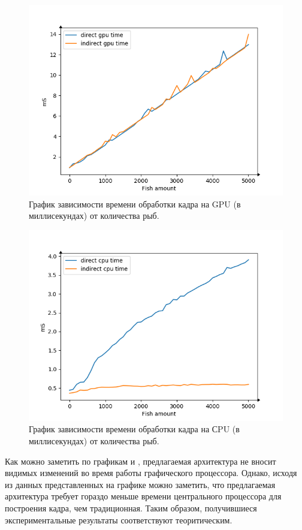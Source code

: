 	\begin{figure}[ht!] 
		\center
		\includegraphics [scale=0.8] {my_folder/images//gpu_plot}	
		\caption{График зависимости времени обработки кадра на GPU (в миллисекундах) от количества рыб.} 
		\label{fig:gpu_plot}
	\end{figure}

	\begin{figure}[ht!] 
		\center
		\includegraphics [scale=0.8] {my_folder/images//cpu_plot}	
		\caption{График зависимости времени обработки кадра на СPU (в миллисекундах) от количества рыб.} 
		\label{fig:cpu_plot}
	\end{figure}
	\FloatBarrier
	
	Как можно заметить по графикам  и , предлагаемая архитектура не вносит видимых изменений во время работы графического процессора. Однако, исходя из данных представленных на графике  можно заметить, что предлагаемая архитектура требует гораздо меньше времени центрального процессора для построения кадра, чем традиционная. Таким образом, получившиеся экспериментальные результаты соответствуют теоритическим. 
	
